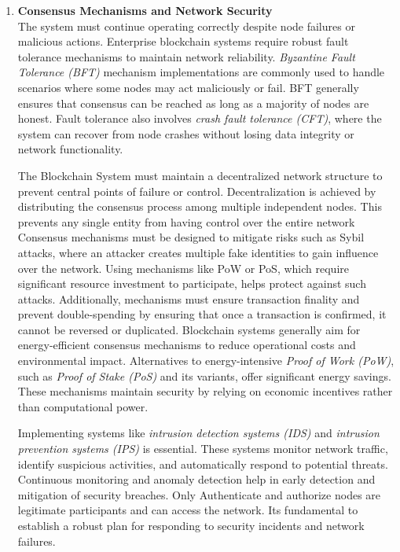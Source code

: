 \begin{enumerate}[label=\textbullet]
	\item\textbf{Consensus Mechanisms and Network Security}\cite{sub_consens}\cite{polkadot_paper}\\
	The system must continue operating correctly despite node failures or malicious actions. Enterprise blockchain systems require robust fault tolerance mechanisms to maintain network reliability. \textit{Byzantine Fault Tolerance (BFT)} mechanism implementations are commonly used to handle scenarios where some nodes may act maliciously or fail. BFT generally ensures that consensus can be reached as long as a majority of nodes are honest. Fault tolerance also involves \textit{crash fault tolerance (CFT)}, where the system can recover from node crashes without losing data integrity or network functionality. 
	
	The Blockchain System must maintain a decentralized network structure to prevent central points of failure or control. Decentralization is achieved by distributing the consensus process among multiple independent nodes. This prevents any single entity from having control over the entire network Consensus mechanisms must be designed to mitigate risks such as Sybil attacks, where an attacker creates multiple fake identities to gain influence over the network. Using mechanisms like PoW or PoS, which require significant resource investment to participate, helps protect against such attacks. Additionally, mechanisms must ensure transaction finality and prevent double-spending by ensuring that once a transaction is confirmed, it cannot be reversed or duplicated. Blockchain systems generally aim for energy-efficient consensus mechanisms to reduce operational costs and environmental impact. Alternatives to energy-intensive \textit{Proof of Work (PoW)}, such as \textit{Proof of Stake (PoS)} and its variants, offer significant energy savings. These mechanisms maintain security by relying on economic incentives rather than computational power. 
	
	Implementing systems like \textit{intrusion detection systems (IDS)} and \textit{intrusion prevention systems (IPS)} is essential. These systems monitor network traffic, identify suspicious activities, and automatically respond to potential threats. Continuous monitoring and anomaly detection help in early detection and mitigation of security breaches. Only Authenticate and authorize nodes are legitimate participants and can access the network. Its fundamental to establish a robust plan for responding to security incidents and network failures. 


\end{enumerate}
